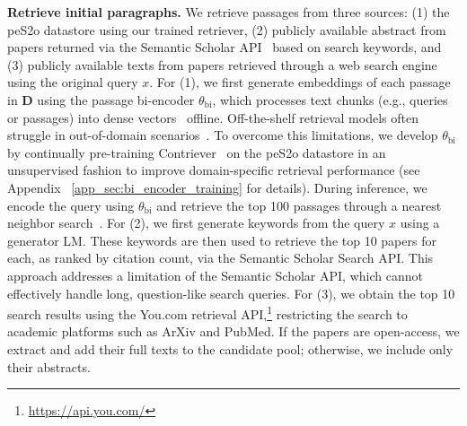 \documentclass{article} %
\renewcommand{\paragraph}[1]{\noindent \textbf{#1}}
\begin{document}
\paragraph{Retrieve initial paragraphs.} 
We retrieve passages from three sources: (1) the peS2o datastore using our trained retriever, (2) publicly available abstract from papers returned via the Semantic Scholar API~\citep{Kinney2023TheSS} based on search keywords, and (3) publicly available texts from papers retrieved through a web search engine using the original query $x$. 
For (1), we first generate embeddings of each passage in $\mathbf{D}$ using the passage bi-encoder $\theta_\text{bi}$, which processes text chunks (e.g., queries or passages) into dense vectors~\citep{karpukhin2020dense} offline. 
Off-the-shelf retrieval models often struggle in out-of-domain scenarios~\citep{thakur2021beir}. 
To overcome this limitations, we develop $\theta_\text{bi}$ by continually pre-training Contriever~\citep{izacard2021towards} on the peS2o datastore in an unsupervised fashion to improve domain-specific retrieval performance (see Appendix ~\ref{app_sec:bi_encoder_training} for details). 
During inference, we encode the query using $\theta_\text{bi}$ and retrieve the top 100 passages through a nearest neighbor search~\citep{karpukhin2020dense}. 
For (2), we first generate keywords from the query $x$ using a generator LM. These keywords are then used to retrieve the top 10 papers for each, as ranked by citation count, via the Semantic Scholar Search API. 
This approach addresses a limitation of the Semantic Scholar API, which cannot effectively handle long, question-like search queries. 
For (3), we obtain the top 10 search results using the You.com retrieval API,\footnote{\url{https://api.you.com/}} restricting the search to academic platforms such as ArXiv and PubMed. If the papers are open-access, we extract and add their full texts to the candidate pool; otherwise, we include only their abstracts. 
\end{document}

